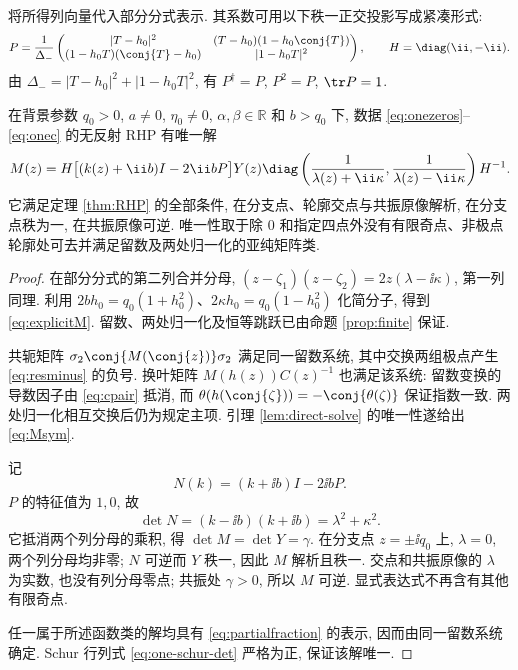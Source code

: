 将所得列向量代入部分分式表示. 其系数可用以下秩一正交投影写成紧凑形式:
\begin{equation}\label{eq:algebraic-P}
P=\dfrac{1}{\Delta_-}
\begin{pmatrix}
|T-h_0|^2&(T-h_0)(1-h_0\conj{T})\\
(1-h_0T)(\conj{T}-h_0)&|1-h_0T|^2
\end{pmatrix},\qquad H=\diag(\ii,-\ii).
\end{equation}
由 $\Delta_-=|T-h_0|^2+|1-h_0T|^2$, 有 $P^\dagger=P$, $P^2=P$, $\tr P=1$.

\begin{theorem}[完整四点轨道的矩阵解]\label{thm:oneRHP}\label{prop:unique-reflectionless}
在背景参数 $q_0>0$, $a\ne0$, $\eta_0\ne0$, $\alpha,\beta\in\mathbb R$ 和 $b>q_0$ 下, 数据 \eqref{eq:onezeros}--\eqref{eq:onec} 的无反射 RHP 有唯一解
\begin{equation}\label{eq:explicitM}
M(z)=H\bigl[(k(z)+\ii b)I-2\ii bP\bigr]Y(z)
\diag\left(\dfrac{1}{\lambda(z)+\ii\kappa},\dfrac{1}{\lambda(z)-\ii\kappa}\right)H^{-1}.
\end{equation}
它满足定理 \ref{thm:RHP} 的全部条件, 在分支点、轮廓交点与共振原像解析, 在分支点秩为一, 在共振原像可逆. 唯一性取于除 $0$ 和指定四点外没有有限奇点、非极点轮廓处可去并满足留数及两处归一化的亚纯矩阵类.
\end{theorem}
\begin{proof}
在部分分式的第二列合并分母,
$(z-\zeta_1)(z-\zeta_2)=2z(\lambda-\ii\kappa)$, 第一列同理. 利用
$2bh_0=q_0(1+h_0^2)$、$2\kappa h_0=q_0(1-h_0^2)$ 化简分子, 得到 \eqref{eq:explicitM}. 留数、两处归一化及恒等跳跃已由命题 \ref{prop:finite} 保证.

共轭矩阵 $\sigma_2\conj{M(\conj{z})}\sigma_2$ 满足同一留数系统, 其中交换两组极点产生 \eqref{eq:resminus} 的负号. 换叶矩阵 $M(h(z))C(z)^{-1}$ 也满足该系统: 留数变换的导数因子由 \eqref{eq:cpair} 抵消, 而 $\theta(h(\conj{\zeta}))=-\conj{\theta(\zeta)}$ 保证指数一致. 两处归一化相互交换后仍为规定主项. 引理 \ref{lem:direct-solve} 的唯一性遂给出 \eqref{eq:Msym}.

记
\begin{equation}\label{eq:Nfactor}
N(k)=(k+\ii b)I-2\ii bP.
\end{equation}
$P$ 的特征值为 $1,0$, 故
\[
\det N=(k-\ii b)(k+\ii b)=\lambda^2+\kappa^2.
\]
它抵消两个列分母的乘积, 得 $\det M=\det Y=\gamma$. 在分支点 $z=\pm\ii q_0$ 上, $\lambda=0$, 两个列分母均非零; $N$ 可逆而 $Y$ 秩一, 因此 $M$ 解析且秩一. 交点和共振原像的 $\lambda$ 为实数, 也没有列分母零点; 共振处 $\gamma>0$, 所以 $M$ 可逆. 显式表达式不再含有其他有限奇点.

任一属于所述函数类的解均具有 \eqref{eq:partialfraction} 的表示, 因而由同一留数系统确定. Schur 行列式 \eqref{eq:one-schur-det} 严格为正, 保证该解唯一.
\end{proof}

